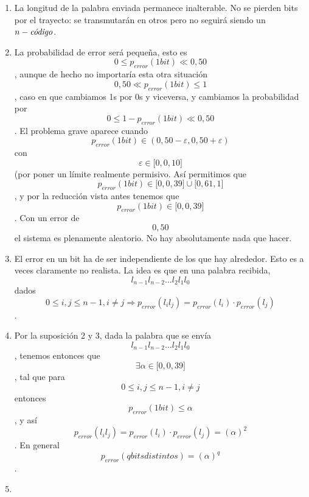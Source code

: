 \begin{enumerate}
\begin{enumerate}
\begin{enumerate}
      \begin{enumerate}
      \def\labelenumiv{\arabic{enumiv}.}
      \tightlist
      \item
        La longitud de la palabra enviada permanece inalterable. No se
        pierden bits por el trayecto: se transmutarán en otros pero no
        seguirá siendo un $n - \text{\textit{código}}$.
      \item
        La probabilidad de error será pequeña, esto
        es\[{0 \leq p_{\mathit{error}}}{{({1\mathit{bit}})} \ll 0,50}\],
        aunque de hecho no importaría esta otra
        situación\[{0,50 \ll p_{\mathit{error}}}{{({1\mathit{bit}})} \leq 1}\],
        caso en que cambiamos 1s por 0s y viceversa, y cambiamos la
        probabilidad por
        \[{0 \leq {1 - p_{\mathit{error}}}}{{({1\mathit{bit}})} \ll 0,50}\].
        El problema grave aparece cuando
        \[p_{\mathit{error}}{{({1\mathit{bit}})} \in \left( {{0,50 - \varepsilon},{0,50 + \varepsilon}} \right)}\]
        con \[\varepsilon \in {\lbrack{0,0,10}\rbrack}\](por poner un
        límite real\-mente permisivo. Así permitimos
        que\[p_{\mathit{error}}{{({1\mathit{bit}})} \in {{\lbrack{0,0,39}\rbrack} \cup {\lbrack{0,61,1}\rbrack}}}\],
        y por la reducción vista antes tenemos que
        \[p_{\mathit{error}}{{({1\mathit{bit}})} \in {\lbrack{0,0,39}\rbrack}}\].
        Con un error de \[0,50\]el sistema es plenamente aleatorio. No
        hay absolutamente nada que hacer.
      \item
        El error en un bit ha de ser independiente de los que hay
        alrededor. Esto es a ve\-ces claramente no realista. La idea es
        que en una palabra recibida,
        \[l_{n - 1}l_{n - 2}\ldots l_{2}l_{1}l_{0}\]dados
        \[{0 \leq i},{j \leq {n - 1}},{i \neq j}\Rightarrow p_{\mathit{error}}{{({l_{i}l_{j}})} = p_{\mathit{error}}}{{(l_{i})} \cdot p_{\mathit{error}}}{(l_{j})}\].
      \item
        Por la suposición 2 y 3, dada la palabra que se envía
        \[l_{n - 1}l_{n - 2}\ldots l_{2}l_{1}l_{0}\], tene\-mos entonces
        que \[\exists{\alpha \in {\lbrack{0,0,39}\rbrack}}\], tal que
        para \[{0 \leq i},{j \leq {n - 1}},{i \neq j}\] entonces
        \[p_{\mathit{error}}{{({1\mathit{bit}})} \leq \alpha}\], y así
        \[p_{\mathit{error}}{{({l_{i}l_{j}})} = p_{\mathit{error}}}{{(l_{i})} \cdot p_{\mathit{error}}}{{(l_{j})} = {(\alpha)}^{2}}\].
        En general
        \[p_{\mathit{error}}{\left( {q\mathit{bits}\mathit{distintos}} \right) = \left( \alpha \right)^{q}}\].
      \item

\end{enumerate}
\end{enumerate}
\end{enumerate}
\end{enumerate}
